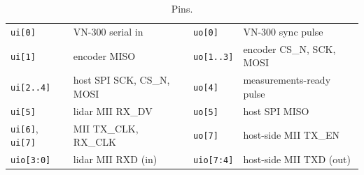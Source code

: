\documentclass[10pt,letterpaper]{article}
\begin{document}
\begin{table}[H]
  \centering\footnotesize
  \caption{Pins.}
  \label{tab:pins}
  \begin{tabular}{@{}ll@{\qquad\qquad}ll@{}}
    \toprule
    \texttt{ui[0]} & VN-300 serial in & \texttt{uo[0]} & VN-300 sync pulse\\
    \texttt{ui[1]} & encoder MISO & \texttt{uo[1..3]} & encoder CS\_N, SCK, MOSI\\
    \texttt{ui[2..4]} & host SPI SCK, CS\_N, MOSI & \texttt{uo[4]} & measurements-ready pulse\\
    \texttt{ui[5]} & lidar MII RX\_DV & \texttt{uo[5]} & host SPI MISO\\
    \texttt{ui[6]}, \texttt{ui[7]} & MII TX\_CLK, RX\_CLK & \texttt{uo[7]} & host-side MII TX\_EN\\
    \texttt{uio[3:0]} & lidar MII RXD (in) & \texttt{uio[7:4]} & host-side MII TXD (out)\\
    \bottomrule
  \end{tabular}
\end{table}
\end{document}
